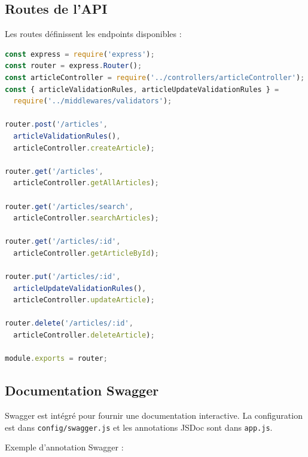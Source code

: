 \documentclass[12pt,a4paper]{article}
\begin{document}
\subsection{Routes de l'API}

Les routes définissent les endpoints disponibles :

\begin{lstlisting}[language=JavaScript, caption=Routes (articles.js)]
const express = require('express');
const router = express.Router();
const articleController = require('../controllers/articleController');
const { articleValidationRules, articleUpdateValidationRules } =
  require('../middlewares/validators');

router.post('/articles',
  articleValidationRules(),
  articleController.createArticle);

router.get('/articles',
  articleController.getAllArticles);

router.get('/articles/search',
  articleController.searchArticles);

router.get('/articles/:id',
  articleController.getArticleById);

router.put('/articles/:id',
  articleUpdateValidationRules(),
  articleController.updateArticle);

router.delete('/articles/:id',
  articleController.deleteArticle);

module.exports = router;
\end{lstlisting}

\subsection{Documentation Swagger}

Swagger est intégré pour fournir une documentation interactive. La configuration est dans \texttt{config/swagger.js} et les annotations JSDoc sont dans \texttt{app.js}.

Exemple d'annotation Swagger :
\end{document}
